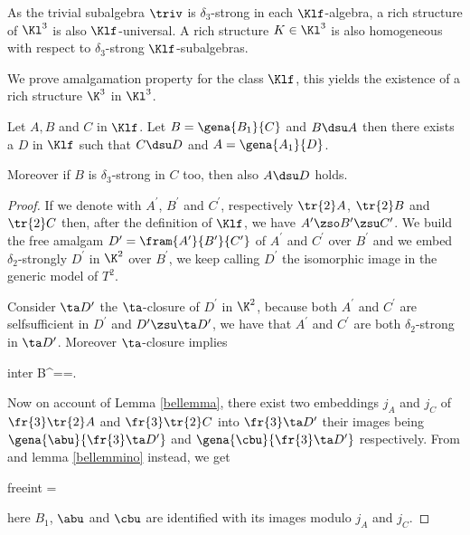 As the trivial subalgebra $\triv$ is $\delta_{3}$-strong in each $\Klf$-algebra,
a rich structure of $\Kl^{3}$ is also $\Klf$-universal. A rich structure $K\in\Kl^{3}$ is also homogeneous
with respect to $\delta_{3}$-strong $\Klf$-subalgebras.

We prove amalgamation property for the class $\Klf$, this yields the existence
of a rich structure $\K^{3}$ in $\Kl^{3}$.
\begin{lem}
Let $A,B$ and $C$ in $\Klf$. Let $B=\gena{B_{1}}{C}$ and $B\dsu A$ then there exists a $D$ in
$\Klf$ such that $C\dsu D$ and $A=\gena{A_{1}}{D}$.

Moreover if $B$ is $\delta_{3}$-strong in $C$ too, then also $A\dsu D$ holds.
\end{lem}
\begin{proof}
If we denote with $A^{\prime}$, $B^{\prime}$ and $C^{\prime}$, respectively $\tr{2}A$, $\tr{2}B$ and
$\tr{2}C$ then, after the definition of $\Klf$, we have $A^{\prime}\zso B^{\prime}\zsu C^{\prime}$.
We build the free amalgam $D^{\prime}=\fram{A^{\prime}}{B^{\prime}}{C^{\prime}}$ of $A^{\prime}$ and $C^{\prime}$ over $B^{\prime}$ and we embed $\delta_{2}$-strongly $D^{\prime}$ in $\K^{2}$ over $B^{\prime}$,
we keep calling $D^{\prime}$ the isomorphic image in the generic model of $T^{2}$.

Consider $\ta D^{\prime}$ the $\ta$-closure of $D^{\prime}$ in $\K^{2}$,
because both $A^{\prime}$ and $C^{\prime}$ are selfsufficient in $D^{\prime}$
and $D^{\prime}\zsu\ta D^{\prime}$, we have that $A^{\prime}$ and $C^{\prime}$ are both $\delta_{2}$-strong
in $\ta D^{\prime}$. Moreover $\ta$-closure implies
\begin{labeq}{inter}
B^{\prime}==\cap{}.
\end{labeq}

Now on account of Lemma \ref{bellemma},
there exist two embeddings $j_{A}$ and $j_{C}$ of $\fr{3}\tr{2}A$ and $\fr{3}\tr{2}C$
into $\fr{3}\ta D^{\prime}$ their images being $\gena{\abu}{\fr{3}\ta D^{\prime}}$ and $\gena{\cbu}
{\fr{3}\ta D^{\prime}}$ respectively. From  and lemma \ref{bellemmino} instead, we get
\begin{labeq}{freeint}
=\cap{}
\end{labeq}
here $B_{1}$, $\abu$ and $\cbu$ are identified with its images modulo $j_{A}$ and $j_{C}$. 


\end{proof}
